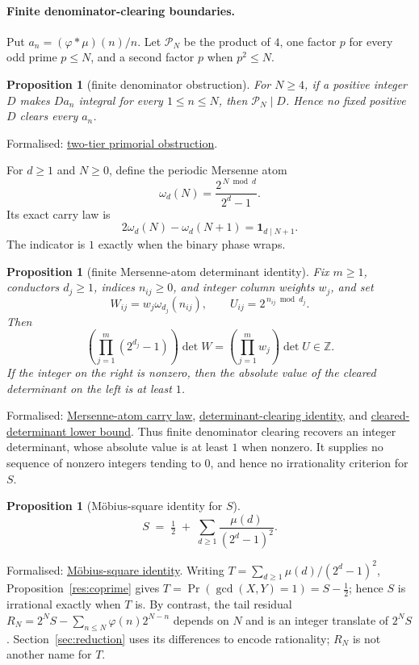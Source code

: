 \documentclass[11pt]{article}
\newcommand{\commit}{312b96c0d149ed466725c62d4ef24cfc91bca34e}
\newcommand{\repobase}{https://github.com/wcook04/plectis-lean-erdos249-257/blob/\commit}
\newcommand{\PK}{Erdos249257}
\newcommand{\lword}[4]{\href{\repobase/\PK/#1\#L#2}{#4}}
\newtheorem{proposition}[theorem]{Proposition}
\theoremstyle{definition}
\theoremstyle{remark}
\newcommand{\Z}{\mathbb{Z}}
\newcommand{\ph}{\varphi}
\begin{document}
{\paragraph{Finite denominator-clearing boundaries.}\label{sec:primitiveindex}
Put \(a_n=(\ph*\mu)(n)/n\).  Let $\mathcal P_N$ be the product of $4$, one factor
$p$ for every odd prime $p\le N$, and a second factor $p$ when $p^2\le N$.
\begin{proposition}[finite denominator obstruction]
\label{res:primitiveindex}
For $N\ge4$, if a positive integer $D$ makes $Da_n$ integral for every
$1\le n\le N$, then $\mathcal P_N\mid D$.  Hence no fixed positive $D$ clears every
$a_n$.
\end{proposition}
\noindent Formalised:
\lword{PrimitiveDeterminantLift.lean}{148}{twoTierPrimorial_dvd_of_integral_jet}{two-tier primorial obstruction}.

For \(d\ge1\) and $N\ge0$, define the periodic Mersenne atom
\[
 \omega_d(N)=\frac{2^{\,N\bmod d}}{2^d-1}.
\]
Its exact carry law is
\[
 2\omega_d(N)-\omega_d(N+1)=\mathbf1_{d\mid N+1}.
\]
The indicator is \(1\) exactly when the binary phase wraps.

\begin{proposition}[finite Mersenne-atom determinant identity]
\label{res:mersennetailatoms}
Fix \(m\ge1\), conductors \(d_j\ge1\), indices \(n_{ij}\ge0\), and integer
column weights \(w_j\), and set
\[
 W_{ij}=w_j\omega_{d_j}(n_{ij}),
 \qquad U_{ij}=2^{\,n_{ij}\bmod d_j}.
\]
Then
\[
 \left(\prod_{j=1}^m(2^{d_j}-1)\right)\det W
 =\left(\prod_{j=1}^m w_j\right)\det U\in\Z.
\]
If the integer on the right is nonzero, then the absolute value of the
cleared determinant on the left is at least \(1\).
\end{proposition}
\noindent Formalised:
\lword{MersenneTailAtoms.lean}{28}{mersenneTailAtom_step}{Mersenne-atom carry law},
\lword{MersenneTailAtoms.lean}{158}{weightedMersenneAtom_denominatorProduct_mul_det}{determinant-clearing identity},
and
\lword{MersenneTailAtoms.lean}{181}{one_le_abs_weightedMersenneAtom_cleared_det}{cleared-determinant lower bound}.
Thus finite denominator clearing recovers an integer determinant, whose
absolute value is at least $1$ when nonzero.  It supplies no sequence of
nonzero integers tending to $0$, and hence no irrationality criterion for \(S\).

\begin{proposition}[M\"obius-square identity for \(S\)]\label{res:lens}
\[
S \;=\; \tfrac12 \;+\; \sum_{d\ge1}\frac{\mu(d)}{(2^d-1)^2}.
\]
\end{proposition}
\noindent Formalised: \lword{CertificateKernel.lean}{18126}{totient_series_eq_half_add_moebius_mersenne_square}{M\"obius-square identity}.
Writing \(T=\sum_{d\ge1}\mu(d)/(2^d-1)^2\), Proposition~\ref{res:coprime}
gives \(T=\Pr(\gcd(X,Y)=1)=S-\tfrac12\); hence $S$ is irrational exactly
when $T$ is.  By contrast, the tail residual
\(R_N=2^NS-\sum_{n\le N}\ph(n)2^{N-n}\) depends on $N$ and is an integer
translate of $2^NS$.  Section~\ref{sec:reduction} uses its differences to
encode rationality; $R_N$ is not another name for $T$.

}
\end{document}
